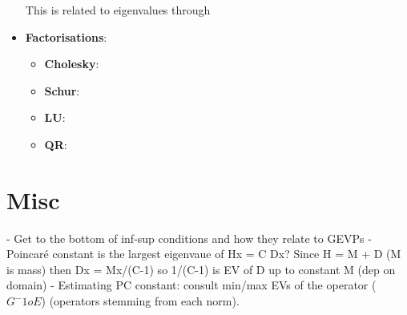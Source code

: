 \begin{itemize}
This is related to eigenvalues through
\item \textbf{Factorisations}:
\begin{itemize}
\item \textbf{Cholesky}:
\item \textbf{Schur}:
\item \textbf{LU}:
\item \textbf{QR}:
\end{itemize}
\end{itemize}

\section{Misc}

- Get to the bottom of inf-sup conditions and how they relate to GEVPs -
Poincaré constant is the largest eigenvaue of Hx = C Dx? Since H = M + D (M is
mass) then Dx = Mx/(C-1) so  1/(C-1) is EV of D up to constant M (dep on domain)
- Estimating PC constant: consult min/max EVs of the operator ($G^-1 o E$)
(operators stemming from each norm).
